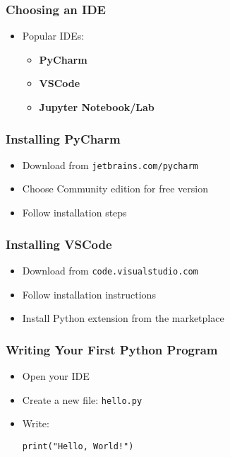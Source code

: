 \documentclass{beamer}
\begin{document}
\begin{frame}
    \frametitle{Choosing an IDE}
    \begin{itemize}
        \item Popular IDEs:
        \begin{itemize}
            \item \textbf{PyCharm}
            \item \textbf{VSCode}
            \item \textbf{Jupyter Notebook/Lab}
        \end{itemize}
    \end{itemize}
\end{frame}

\begin{frame}
    \frametitle{Installing PyCharm}
    \begin{itemize}
        \item Download from \texttt{jetbrains.com/pycharm}
        \item Choose Community edition for free version
        \item Follow installation steps
    \end{itemize}
\end{frame}

\begin{frame}
    \frametitle{Installing VSCode}
    \begin{itemize}
        \item Download from \texttt{code.visualstudio.com}
        \item Follow installation instructions
        \item Install Python extension from the marketplace
    \end{itemize}
\end{frame}

\begin{frame}
    \frametitle{Writing Your First Python Program}
    \begin{itemize}
        \item Open your IDE
        \item Create a new file: \texttt{hello.py}
        \item Write:
        \begin{tcolorbox}[colback=lightblue, colframe=darkblue, title=Hello World Program]
            \lstinline|print("Hello, World!")|
        \end{tcolorbox}
    \end{itemize}
\end{frame}
\end{document}
